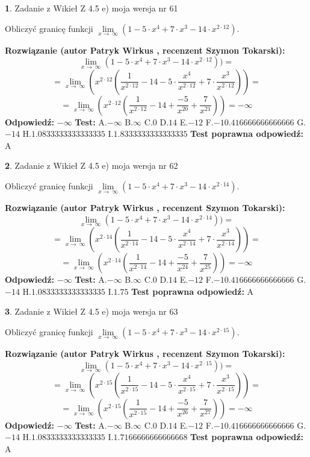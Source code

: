 \documentclass[12pt, a4paper]{article}
\theoremstyle{definition} %
\newtheorem{zad}{}
\newcommand{\zadStart}[1]{\begin{zad}#1\newline}
\newcommand{\zadStop}{\end{zad}}
\newcommand{\rozwStart}[2]{\noindent \textbf{Rozwiązanie (autor #1 , recenzent #2): }\newline}
\newcommand{\rozwStop}{\newline}
\newcommand{\odpStart}{\noindent \textbf{Odpowiedź:}\newline}
\newcommand{\odpStop}{\newline}
\newcommand{\testStart}{\noindent \textbf{Test:}\newline}
\newcommand{\testStop}{\newline}
\newcommand{\kluczStart}{\noindent \textbf{Test poprawna odpowiedź:}\newline}
\newcommand{\kluczStop}{\newline}
\begin{document}
\zadStart{Zadanie z Wikieł Z 4.5 e) moja wersja nr 61}


Obliczyć granicę funkcji  $\lim\limits_{x\to\ \infty}(1 - 5 \cdot x^{4}+7 \cdot x^{3}- 14 \cdot x^{2\cdot12})$.
\zadStop
\rozwStart{Patryk Wirkus}{Szymon Tokarski}
$$\lim\limits_{x\to\ \infty}(1 - 5 \cdot x^{4}+7 \cdot x^{3}- 14 \cdot x^{2\cdot12}))=$$
$$=\lim\limits_{x\to\ \infty}(x^{2\cdot12}(\frac{1}{x^{2\cdot12}}-14 -5 \cdot \frac{x^{4}}{x^{2\cdot12}}+7 \cdot \frac{x^{3}}{x^{2\cdot12}}))=$$
$$=\lim\limits_{x\to\ \infty}(x^{2\cdot12}(\frac{1}{x^{2\cdot12}}-14 + \frac{-5}{x^{20}}+ \frac{7}{x^{21}}))=-\infty$$
\rozwStop
\odpStart
$-\infty$
\odpStop
\testStart
A.$-\infty$ B.$\infty$ C.$0$ D.$14$ E.$-12$
F.$-10.416666666666666$ G.$-14$
H.$1.0833333333333335$
I.$1.8333333333333335$
\testStop
\kluczStart
A
\kluczStop



\zadStart{Zadanie z Wikieł Z 4.5 e) moja wersja nr 62}


Obliczyć granicę funkcji  $\lim\limits_{x\to\ \infty}(1 - 5 \cdot x^{4}+7 \cdot x^{3}- 14 \cdot x^{2\cdot14})$.
\zadStop
\rozwStart{Patryk Wirkus}{Szymon Tokarski}
$$\lim\limits_{x\to\ \infty}(1 - 5 \cdot x^{4}+7 \cdot x^{3}- 14 \cdot x^{2\cdot14}))=$$
$$=\lim\limits_{x\to\ \infty}(x^{2\cdot14}(\frac{1}{x^{2\cdot14}}-14 -5 \cdot \frac{x^{4}}{x^{2\cdot14}}+7 \cdot \frac{x^{3}}{x^{2\cdot14}}))=$$
$$=\lim\limits_{x\to\ \infty}(x^{2\cdot14}(\frac{1}{x^{2\cdot14}}-14 + \frac{-5}{x^{24}}+ \frac{7}{x^{25}}))=-\infty$$
\rozwStop
\odpStart
$-\infty$
\odpStop
\testStart
A.$-\infty$ B.$\infty$ C.$0$ D.$14$ E.$-12$
F.$-10.416666666666666$ G.$-14$
H.$1.0833333333333335$
I.$1.75$
\testStop
\kluczStart
A
\kluczStop



\zadStart{Zadanie z Wikieł Z 4.5 e) moja wersja nr 63}


Obliczyć granicę funkcji  $\lim\limits_{x\to\ \infty}(1 - 5 \cdot x^{4}+7 \cdot x^{3}- 14 \cdot x^{2\cdot15})$.
\zadStop
\rozwStart{Patryk Wirkus}{Szymon Tokarski}
$$\lim\limits_{x\to\ \infty}(1 - 5 \cdot x^{4}+7 \cdot x^{3}- 14 \cdot x^{2\cdot15}))=$$
$$=\lim\limits_{x\to\ \infty}(x^{2\cdot15}(\frac{1}{x^{2\cdot15}}-14 -5 \cdot \frac{x^{4}}{x^{2\cdot15}}+7 \cdot \frac{x^{3}}{x^{2\cdot15}}))=$$
$$=\lim\limits_{x\to\ \infty}(x^{2\cdot15}(\frac{1}{x^{2\cdot15}}-14 + \frac{-5}{x^{26}}+ \frac{7}{x^{27}}))=-\infty$$
\rozwStop
\odpStart
$-\infty$
\odpStop
\testStart
A.$-\infty$ B.$\infty$ C.$0$ D.$14$ E.$-12$
F.$-10.416666666666666$ G.$-14$
H.$1.0833333333333335$
I.$1.7166666666666668$
\testStop
\kluczStart
A
\kluczStop
\end{document}
